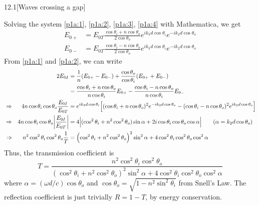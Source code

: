 \documentclass[12pt]{article}
\begin{document}
\begin{problem}{12.1}[Waves crossing a gap]
\begin{solution}
Solving the system \eqref{p1a:1}, \eqref{p1a:2}, \eqref{p1a:3}, \eqref{p1a:4}
with Mathematica, we get
\begin{subequations}
    \begin{align}
        E_{0+}
        &=E_{0T}\frac{\cos\theta_i+n\cos\theta_o}{2\cos\theta_o}e^{ik_3d\cos\theta_i}e^{-ik_2d\cos\theta_o}\\
        E_{0-}
        &=E_{0T}\frac{\cos\theta_i -n\cos\theta_o}{2\cos\theta_o}
        e^{ik_3d\cos\theta_i}e^{-ik_2d\cos\theta_o}
    \end{align} 
\end{subequations}
From \eqref{p1a:1} and \eqref{p1a:2}, we can write
\begin{align}
    &&2E_{0I}&=\frac1n\qty(E_{0+}-E_{0-})+\frac{\cos\theta_o}{\cos\theta_i}\qty(E_{0+}+E_{0-})\notag\\
    &&&=\frac{\cos\theta_i+n\cos\theta_o}{n\cos\theta_i}E_{0+}
    -\frac{\cos\theta_i-n\cos\theta_o}{n\cos\theta_i}E_{0-}\notag\\
    &\Rightarrow&
    4n\cos\theta_i\cos\theta_o\frac{E_{0I}}{E_{0T}}
    &=e^{ik_3d\cos\theta_i}\qty[(\cos\theta_i+n\cos\theta_o)^2e^{-ik_2d\cos\theta_o}-(\cos\theta_i-n\cos\theta_o)^2e^{ik_2d\cos\theta_o}]\notag\\
    &\Rightarrow&
    4n\cos\theta_i\cos\theta_o\abs{\frac{E_{0I}}{E_{0T}}}
    &=4\abs{(\cos^2\theta_i+n^2\cos^2\theta_o)\sin\alpha
    +2i\cos\theta_i\cos\theta_o\cos\alpha}\tag{$\alpha=k_2d\cos\theta_o$}\\
    &\Rightarrow&
    n^2\cos^2\theta_i\cos^2\theta_o\frac1T
    &=\qty(\cos^2\theta_i+n^2\cos^2\theta_o)^2\sin^2\alpha
    +4\cos^2\theta_i\cos^2\theta_o\cos^2\alpha
\end{align}
Thus, the transmission coefficient is
\begin{equation}
    T=\frac{n^2\cos^2\theta_i\cos^2\theta_o}{(\cos^2\theta_i+n^2\cos^2\theta_o)^2\sin^2\alpha+4\cos^2\theta_i\cos^2\theta_o\cos^2\alpha} 
\end{equation}
where $\alpha=(\omega d/c)\cos\theta_o$ and
$\cos\theta_o=\sqrt{1-n^2\sin^2\theta_i}$ from Snell's Law. The reflection
coefficient is just trivially $R=1-T$, by energy conservation.


\end{solution}
\end{problem}
\end{document}
